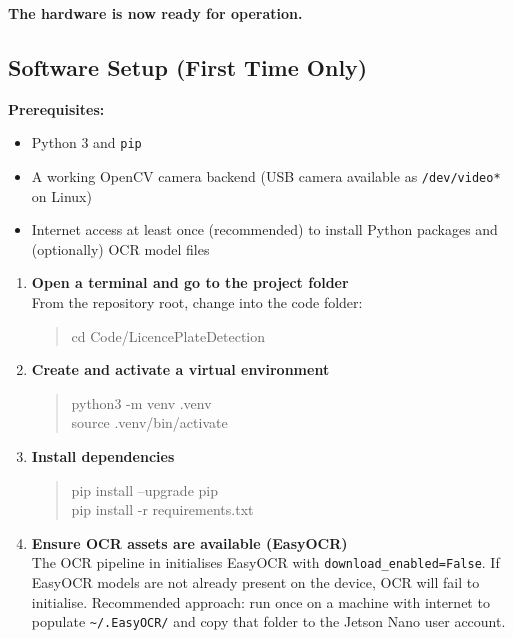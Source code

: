 \documentclass[11pt,a4paper]{article}
\begin{document}
\textbf{The hardware is now ready for operation.}

\subsection{Software Setup (First Time Only)}
\textbf{Prerequisites:}
\begin{itemize}
    \item Python 3 and \texttt{pip}
    \item A working OpenCV camera backend (USB camera available as \texttt{/dev/video*} on Linux)
    \item Internet access at least once (recommended) to install Python packages and (optionally) OCR model files
\end{itemize}

\begin{enumerate}
    \item \textbf{Open a terminal and go to the project folder}\\
    From the repository root, change into the code folder:
    \begin{quote}\ttfamily
    cd Code/LicencePlateDetection
    \end{quote}

    \item \textbf{Create and activate a virtual environment}\\
    \begin{quote}\ttfamily
    python3 -m venv .venv\\
    source .venv/bin/activate
    \end{quote}

    \item \textbf{Install dependencies}\\
    \begin{quote}\ttfamily
    pip install --upgrade pip\\
    pip install -r requirements.txt
    \end{quote}

    \item \textbf{Ensure OCR assets are available (EasyOCR)}\\
    The OCR pipeline in  initialises EasyOCR with \texttt{download\_enabled=False}.
    If EasyOCR models are not already present on the device, OCR will fail to initialise.
    Recommended approach: run once on a machine with internet to populate \texttt{\textasciitilde/.EasyOCR/} and copy that folder to the Jetson Nano user account.
\end{enumerate}
\end{document}
